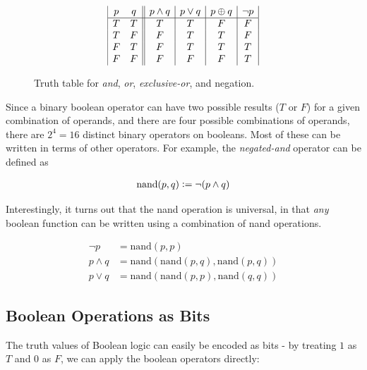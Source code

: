 \begin{figure}
  \centering

  \begin{displaymath}
\begin{array}{|c c||c|c|c|c|}
p & q & p \land q & p \lor q & p \oplus q & \neg p \\
\hline
T & T & T & T & F & F\\
T & F & F & T & T & F\\
F & T & F & T & T & T\\
F & F & F & F & F & T\\
\end{array}
\end{displaymath}
  \caption{Truth table for \emph{and}, \emph{or}, \emph{exclusive-or}, and negation.}
  \label{fig:truth-tables}
\end{figure}

Since a binary boolean operator can have two possible results ($T$ or
$F$) for a given combination of operands, and there are four possible
combinations of operands, there are $2^{4}=16$ distinct binary
operators on booleans.  Most of these can be written in terms of other
operators.  For example, the \emph{negated-and} operator can be defined as

\begin{align}
  \mathrm{nand}(p,q) \vcentcolon= \neg (p \land q)
\end{align}

Interestingly, it turns out that the nand operation is universal, in
that \emph{any} boolean function can be written using a combination of
nand operations.

\begin{example}
\begin{align}
  \neg p &= \mathrm{nand}(p,p) \\
  p \land q &= \mathrm{nand}(\mathrm{nand}(p,q),\mathrm{nand}(p,q)) \\
  p \lor q &= \mathrm{nand}(\mathrm{nand}(p,p),\mathrm{nand}(q,q))
\end{align}
\end{example}

\subsection{Boolean Operations as Bits}

The truth values of Boolean logic can easily be encoded as bits - by
treating $1$ as $T$ and $0$ as $F$, we can apply the boolean operators
directly:


